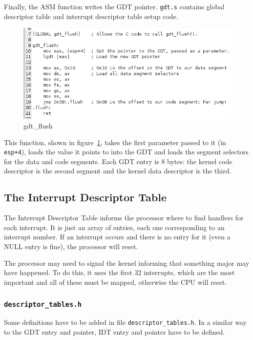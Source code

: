 \documentclass{report}
\begin{document}
Finally, the ASM function writes the GDT pointer.
\texttt{gdt.s} contains global descriptor table and interrupt descriptor table setup code.

\begin{figure}[hbtp]
\centering
\includegraphics[scale=0.4]{images/es02/gdt_flush.png}
\caption{gdt\_flush}
\label{gdt_flush}
\end{figure}

This function, shown in figure~\ref{gdt_flush}, takes the first parameter passed to it (in \texttt{esp+4}), loads the value it points to into the GDT and loads the segment selectors for the data and code segments. Each GDT entry is 8 bytes: the kernel code descriptor is the second segment and the kernel data descriptor is the third.

\newpage
\subsection*{The Interrupt Descriptor Table}
The Interrupt Descriptor Table informs the processor where to find handlers for each interrupt. It is just an array of entries, each one corresponding to an interrupt number. If an interrupt occurs and there is no entry for it (even a NULL entry is fine), the processor will reset. 

The processor may need to signal the kernel informing that something major may have happened. To do this, it uses the first 32 interrupts, which are the most important and all of these must be mapped, otherwise the CPU will reset. 

\subsubsection*{\texttt{descriptor\_tables.h}}
Some definitions have to be added in file \texttt{descriptor\_tables.h}.
In a similar way to the GDT entry and pointer, IDT entry and pointer have to be defined.
\end{document}
